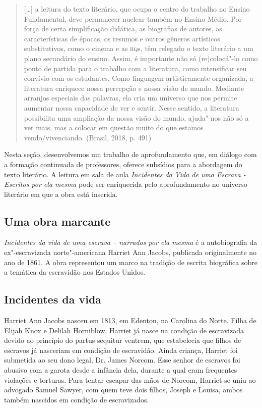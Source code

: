 \documentclass[11pt]{extarticle}
\begin{document}
\begin{quote}
{[}\ldots{}{]} a leitura do texto literário, que ocupa o centro do trabalho
no Ensino Fundamental, deve permanecer nuclear também no Ensino Médio.
Por força de certa simplificação didática, as biografias de autores, as
características de épocas, os resumos e outros gêneros artísticos
substitutivos, como o cinema e as \textsc{hq}s, têm relegado o texto literário a
um plano secundário do ensino. Assim, é importante não só (re)colocá"-lo
como ponto de partida para o trabalho com a literatura, como
intensificar seu convívio com os estudantes. Como linguagem
artisticamente organizada, a literatura enriquece nossa percepção e
nossa visão de mundo. Mediante arranjos especiais das palavras, ela cria
um universo que nos permite aumentar nossa capacidade de ver e sentir.
Nesse sentido, a literatura possibilita uma ampliação da nossa visão do
mundo, ajuda"-nos não só a ver mais, mas a colocar em questão muito do
que estamos vendo/vivenciando. (Brasil, 2018, p. 491)
\end{quote}

Nesta seção, desenvolvemos um trabalho de aprofundamento que, em diálogo
com a formação continuada de professores, oferece subsídios para a
abordagem do texto literário. A leitura em sala de aula \emph{Incidentes
da Vida de uma Escrava - Escritos por ela mesma} pode ser enriquecida
pelo aprofundamento no universo literário em que a obra está inserida.

\subsection{Uma obra marcante}

\emph{Incidentes da vida de uma escrava -- narrados por ela mesma} é a
autobiografia da ex"-escravizada norte"-americana Harriet Ann Jacobs,
publicada originalmente no ano de 1861. A obra representou um marco na
tradição de escrita biográfica sobre a temática da escravidão nos
Estados Unidos.




\subsection{Incidentes da vida}

Harriet Ann Jacobs nasceu em 1813, em Edenton, na Carolina do
Norte. Filha de Elijah Knox e Delilah Horniblow, Harriet já nasce na
condição de escravizada devido ao princípio do partus sequitur ventrem,
que estabelecia que filhos de escravos já nasceriam em condição de
escravidão. Ainda criança, Harriet foi submetida ao seu dono legal, Dr.
James Norcom. Esse senhor de escravos foi abusivo com a garota desde a
infância dela, durante a qual eram frequentes violações e torturas. Para
tentar escapar das mãos de Norcom, Harriet se uniu ao advogado Samuel
Sawyer, com quem teve dois filhos, Joseph e Louisa, ambos também
nascidos em condição de escravizados.
\end{document}
